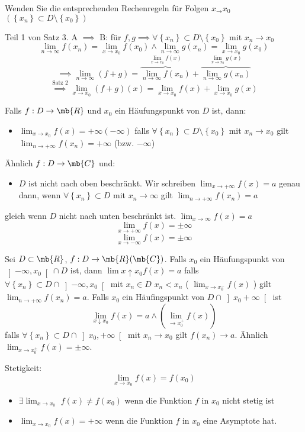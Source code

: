 \begin{Bew}
  Wenden Sie die entsprechenden Rechenregeln für Folgen $x_\to x_0$ $\left( \left\{ x_n \right\}\subset D\setminus \left\{ x_0 \right\} \right)$
\end{Bew}
\begin{Bsp}
  Teil 1 von Satz 3. A $\implies$ B: für $f,g\implies\forall \left\{ x_n \right\}\subset D\setminus \left\{ x_0 \right\}$ mit $x_n\to x_0$
  \[\lim_{n\to \infty} f(x_n)=\lim_{x\to x_0}f(x_0)\wedge\lim_{n\to \infty} g(x_n)=\lim_{x\to x_0}g(x_0)\]
  \[\implies \lim_{n\to\infty}(f+g)=\overbrace{\lim_{n\to\infty}f(x_n)}^{\lim_{x\to x_0}f(x)}+\overbrace{\lim_{n\to \infty}g(x_n)}^{\lim_{x\to x_0}g(x)}\]
  \[\stackrel{\text{Satz 2}}{\implies}\lim_{x\to x_0}(f+g)(x)=\lim_{x\to x_0} f(x)+\lim_{x\to x_0} g(x)\]
\end{Bsp}
\begin{Def}
  Falls $f:D\to\mb{R}$ und $x_0$ ein Häufungspunkt von $D$ ist, dann:
  \begin{itemize}
    \item $\lim_{x\to x_0}f(x)=+\infty(-\infty)$ falls $\forall \left\{ x_n \right\}\subset D\setminus \left\{ x_0 \right\}$ mit $x_n\to x_0$ gilt $\lim_{n\to +\infty}f(x_n)=+\infty$ (bzw. $-\infty$)
  \end{itemize}
  Ähnlich $f:D\to\mb{C}$ und:
  \begin{itemize}
    \item $D$ ist nicht nach oben beschränkt. Wir schreiben $\lim_{x\to+\infty}f(x)=a$ genau dann, wenn $\forall\left\{ x_n \right\}\subset D$ mit $x_n\to\infty$ gilt $\lim_{n\to+\infty}f(x_n)=a$
  \end{itemize}
  gleich wenn $D$ nicht nach unten beschränkt ist. $\lim_{x\to\infty}f(x)=a$
  \[\lim_{x\to+\infty}f(x)=\pm\infty\]
  \[\lim_{x\to-\infty}f(x)=\pm\infty\]
\end{Def}
\begin{Def}
  Sei $D\subset\mb{R}$, $f:D\to\mb{R}(\mb{C})$. Falls $x_0$ ein Häufungspunkt von $\left] -\infty,x_0 \right[\cap D$ ist, dann $\lim{x\uparrow x_0}f(x)=a$ falls $\forall \left\{ x_n \right\}\subset D\cap \left] -\infty, x_0 \right[$ mit $x_n\in D$ $x_n<x_n$ \left( $\lim_{x\to x_0^-}f(x)$ \right) gilt $\lim_{n\to+\infty}f(x_n)=a$. Falls $x_0$ ein Häufingspunkt von $D\cap \left] x_0+\infty \right[$ ist
  \[\lim_{x\downarrow x_0}f(x)=a\wedge(\lim_{\to x_0^+} f(x))\]
  falls $\forall \left\{ x_n \right\}\subset D\cap \left] x_0, +\infty \right[$ mit $x_n\to x_0$ gilt $f(x_n)\to a$. Ähnlich $\lim_{x\to x_0^\pm}f(x)=\pm\infty$.
\end{Def}
\begin{Bsp}
  Stetigkeit:
  \[\lim_{x\to x_0}f(x)=f(x_0)\]
  \begin{itemize}
    \item $\exists \lim_{x\to x_0}$ $f(x)\neq f(x_0)$ wenn die Funktion $f$ in $x_0$ nicht stetig ist
    \item $\lim_{x\to x_0}f(x)=+\infty$ wenn die Funktion $f$ in $x_0$ eine Asymptote hat.
  \end{itemize}
\end{Bsp}
